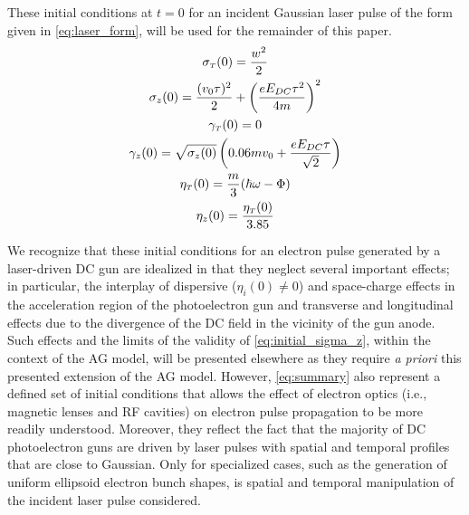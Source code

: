 These initial conditions at $t=0$ for an incident Gaussian laser pulse of the form given in \ref{eq:laser_form}, will be used for the remainder of this paper.
\begin{subequations} \label{eq:summary}
  \begin{gather}
    \sigma_{ {\scriptscriptstyle T} } ( 0 ) = \frac{ w^{ 2 } }{ 2 } \\
    \sigma_{ z } ( 0 ) = \frac{ ( v_{ 0 } \tau )^{ 2 } }{ 2 } + \left ( \frac{ e E_{ DC } \tau^{ 2 } }{ 4 m } \right )^{ 2 } \\
    \gamma_{ {\scriptscriptstyle T} } ( 0 ) = 0 \\
    \gamma_{ z } ( 0 ) = \sqrt{ \sigma_{ z } ( 0 ) } \left ( 0.06 m v_{ 0 } + \frac{ e E_{DC} \tau }{ \sqrt{ 2 } } \right ) \\
    \eta_{ {\scriptscriptstyle T} } ( 0 ) = \frac{ m }{ 3 } ( \hbar \omega - \Phi ) \\
    \eta_{ z } ( 0 ) = \frac{ \eta_{ {\scriptscriptstyle T} } ( 0 ) }{ 3.85 }
  \end{gather}
\end{subequations}

We recognize that these initial conditions for an electron pulse generated by a laser-driven DC gun are idealized in that they neglect several important effects; in particular, the interplay of dispersive ($ \eta_{i}(0) \neq 0 $) and space-charge effects in the acceleration region of the photoelectron gun and transverse and longitudinal effects due to the divergence of the DC field in the vicinity of the gun anode.\cite{berger_dc_2009,togawa_ceb6_2007}
Such effects and the limits of the validity of \ref{eq:initial_sigma_z}, within the context of the AG model, will be presented elsewhere as they require \textit{a priori} this presented extension of the AG model.
However, \ref{eq:summary} also represent a defined set of initial conditions that allows the effect of electron optics (i.e., magnetic lenses and RF cavities) on electron pulse propagation to be more readily understood.
Moreover, they reflect the fact that the majority of DC photoelectron guns are driven by laser pulses with spatial and temporal profiles that are close to Gaussian.\cite{williamson_clocking_1997,sciaini_electronic_2009}
Only for specialized cases, such as the generation of uniform ellipsoid electron bunch shapes, is spatial and temporal manipulation of the incident laser pulse considered.\cite{luiten_how_2004,li_generating_2008}


